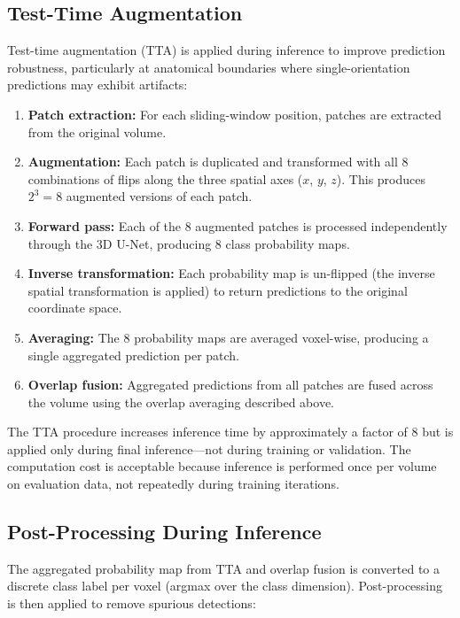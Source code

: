 \subsection{Test-Time Augmentation}

Test-time augmentation (TTA) is applied during inference to improve prediction robustness, particularly at anatomical boundaries where single-orientation predictions may exhibit artifacts:

\begin{enumerate}
    \item \textbf{Patch extraction:} For each sliding-window position, patches are extracted from the original volume.
    \item \textbf{Augmentation:} Each patch is duplicated and transformed with all 8 combinations of flips along the three spatial axes ($x$, $y$, $z$). This produces $2^3 = 8$ augmented versions of each patch.
    \item \textbf{Forward pass:} Each of the 8 augmented patches is processed independently through the 3D U-Net, producing 8 class probability maps.
    \item \textbf{Inverse transformation:} Each probability map is un-flipped (the inverse spatial transformation is applied) to return predictions to the original coordinate space.
    \item \textbf{Averaging:} The 8 probability maps are averaged voxel-wise, producing a single aggregated prediction per patch.
    \item \textbf{Overlap fusion:} Aggregated predictions from all patches are fused across the volume using the overlap averaging described above.
\end{enumerate}

The TTA procedure increases inference time by approximately a factor of 8 but is applied only during final inference---not during training or validation. The computation cost is acceptable because inference is performed once per volume on evaluation data, not repeatedly during training iterations.

\subsection{Post-Processing During Inference}

The aggregated probability map from TTA and overlap fusion is converted to a discrete class label per voxel (argmax over the class dimension). Post-processing is then applied to remove spurious detections:

